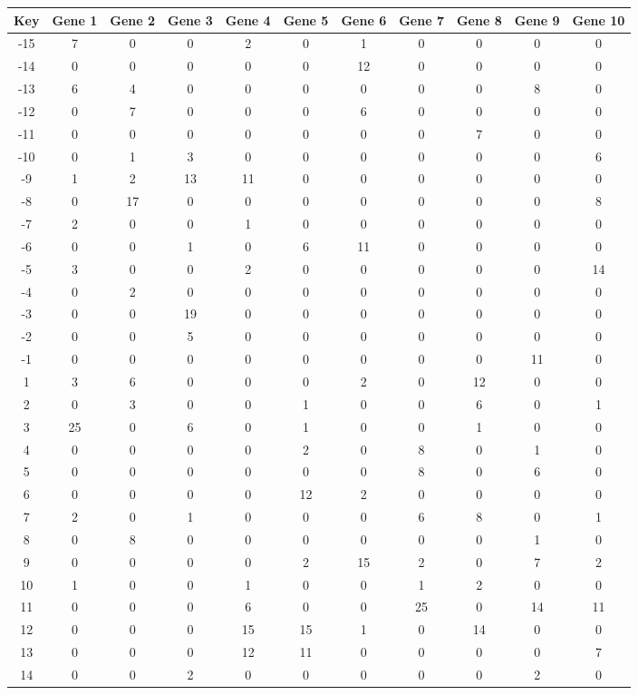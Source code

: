 \begin{tabular}{|c|c|c|c|c|c|c|c|c|c|c|}
\hline
Key & Gene 1 & Gene 2 & Gene 3 & Gene 4 & Gene 5 & Gene 6 & Gene 7 & Gene 8 & Gene 9 & Gene 10 \\
\hline
-15 & 7 & 0 & 0 & 2 & 0 & 1 & 0 & 0 & 0 & 0 \\
-14 & 0 & 0 & 0 & 0 & 0 & 12 & 0 & 0 & 0 & 0 \\
-13 & 6 & 4 & 0 & 0 & 0 & 0 & 0 & 0 & 8 & 0 \\
-12 & 0 & 7 & 0 & 0 & 0 & 6 & 0 & 0 & 0 & 0 \\
-11 & 0 & 0 & 0 & 0 & 0 & 0 & 0 & 7 & 0 & 0 \\
-10 & 0 & 1 & 3 & 0 & 0 & 0 & 0 & 0 & 0 & 6 \\
-9 & 1 & 2 & 13 & 11 & 0 & 0 & 0 & 0 & 0 & 0 \\
-8 & 0 & 17 & 0 & 0 & 0 & 0 & 0 & 0 & 0 & 8 \\
-7 & 2 & 0 & 0 & 1 & 0 & 0 & 0 & 0 & 0 & 0 \\
-6 & 0 & 0 & 1 & 0 & 6 & 11 & 0 & 0 & 0 & 0 \\
-5 & 3 & 0 & 0 & 2 & 0 & 0 & 0 & 0 & 0 & 14 \\
-4 & 0 & 2 & 0 & 0 & 0 & 0 & 0 & 0 & 0 & 0 \\
-3 & 0 & 0 & 19 & 0 & 0 & 0 & 0 & 0 & 0 & 0 \\
-2 & 0 & 0 & 5 & 0 & 0 & 0 & 0 & 0 & 0 & 0 \\
-1 & 0 & 0 & 0 & 0 & 0 & 0 & 0 & 0 & 11 & 0 \\
1 & 3 & 6 & 0 & 0 & 0 & 2 & 0 & 12 & 0 & 0 \\
2 & 0 & 3 & 0 & 0 & 1 & 0 & 0 & 6 & 0 & 1 \\
3 & 25 & 0 & 6 & 0 & 1 & 0 & 0 & 1 & 0 & 0 \\
4 & 0 & 0 & 0 & 0 & 2 & 0 & 8 & 0 & 1 & 0 \\
5 & 0 & 0 & 0 & 0 & 0 & 0 & 8 & 0 & 6 & 0 \\
6 & 0 & 0 & 0 & 0 & 12 & 2 & 0 & 0 & 0 & 0 \\
7 & 2 & 0 & 1 & 0 & 0 & 0 & 6 & 8 & 0 & 1 \\
8 & 0 & 8 & 0 & 0 & 0 & 0 & 0 & 0 & 1 & 0 \\
9 & 0 & 0 & 0 & 0 & 2 & 15 & 2 & 0 & 7 & 2 \\
10 & 1 & 0 & 0 & 1 & 0 & 0 & 1 & 2 & 0 & 0 \\
11 & 0 & 0 & 0 & 6 & 0 & 0 & 25 & 0 & 14 & 11 \\
12 & 0 & 0 & 0 & 15 & 15 & 1 & 0 & 14 & 0 & 0 \\
13 & 0 & 0 & 0 & 12 & 11 & 0 & 0 & 0 & 0 & 7 \\
14 & 0 & 0 & 2 & 0 & 0 & 0 & 0 & 0 & 2 & 0 \\
\hline
\end{tabular}